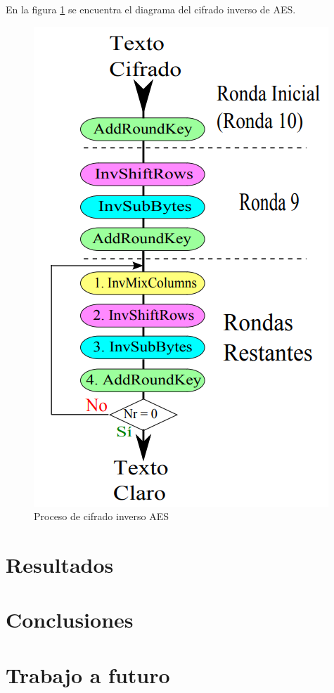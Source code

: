 \documentclass[peerreview]{IEEEtran}
\begin{document}
En la figura \ref{fig:9} se encuentra el diagrama del cifrado inverso de AES.
\begin{figure}[h]
	\includegraphics[scale=0.6]{figuras/diagrama2.png}
	\centering
	\caption{Proceso de cifrado inverso AES}
	\label{fig:9}
\end{figure}



\section{Resultados}
\section{Conclusiones}
\section{Trabajo a futuro}
\end{document}
